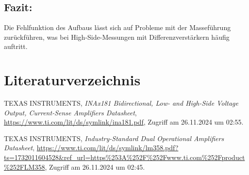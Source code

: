 \documentclass[12pt, a4paper]{article}
\begin{document}
\subsection{Fazit:}
Die Fehlfunktion des Aufbaus lässt sich auf Probleme mit der Masseführung zurückführen, was bei High-Side-Messungen mit Differenzverstärkern häufig auftritt.




\newpage
\section{Literaturverzeichnis}
\begin{thebibliography}{9} %
TEXAS INSTRUMENTS, 
\textit{INAx181 Bidirectional, Low- and High-Side Voltage Output,
Current-Sense Amplifiers Datasheet}, 
\url{https://www.ti.com/lit/ds/symlink/ina181.pdf}, 
Zugriff am 26.11.2024 um 02:55.

TEXAS INSTRUMENTS, 
\textit{Industry-Standard Dual Operational Amplifiers Datasheet}, 
\url{https://www.ti.com/lit/ds/symlink/lm358.pdf?ts=1732011604528&ref_url=https%253A%252F%252Fwww.ti.com%252Fproduct%252FLM358}, 
Zugriff am 26.11.2024 um 02:45.

\end{thebibliography}
\end{document}
